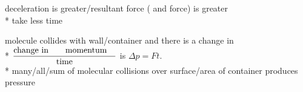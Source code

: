 \begin{question}%

  deceleration is greater/resultant force ( and  force) is greater~\hfill{}\\*
  take less time~\hfill{}
\end{question}

\begin{question}%

  molecule collides with wall/container and there is a change in ~\hfill{}\vspace{0.5em}\\*
  $\frac{\text{change in \refterm{momentum}}}{\text{time}}$ is  \OR $\Delta p = Ft$.~\hfill{}\vspace{0.5em}\\*
  many/all/sum of molecular collisions over surface/area of container produces pressure~\hfill{}
\end{question}
